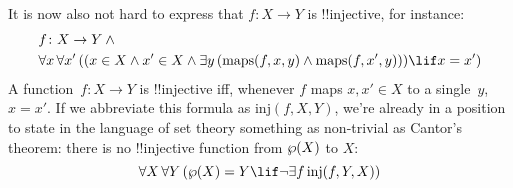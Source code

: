 \documentclass[../../../include/open-logic-section]{subfiles}
\begin{document}
It is now also not hard to express that $f\colon X \to Y$ is
!!{injective}, for instance:
\begin{align*}
& f \colon X \to Y \land {}\\
& \lforall[x][\lforall[x'][((x \in X \land x' \in
    X \land \lexists[y][(\mathrm{maps}(f, x, y) \land \mathrm{maps}(f,
        x', y))]) \lif x = x')]]
\end{align*}
A function~$f\colon X \to Y$ is !!{injective} iff, whenever $f$ maps $x, x'
\in X$ to a single~$y$, $x = x'$.  If we abbreviate this formula as
$\mathrm{inj}(f, X, Y)$, we're already in a position to state in the
language of set theory something as non-trivial as Cantor's theorem:
there is no !!{injective} function from $\wp(X)$ to $X$:
\[
\lforall[X][\lforall[Y][(\Pow{X} = Y \lif
    \lnot\lexists[f][\mathrm{inj}(f, Y, X)])]]
\]
\end{document}

